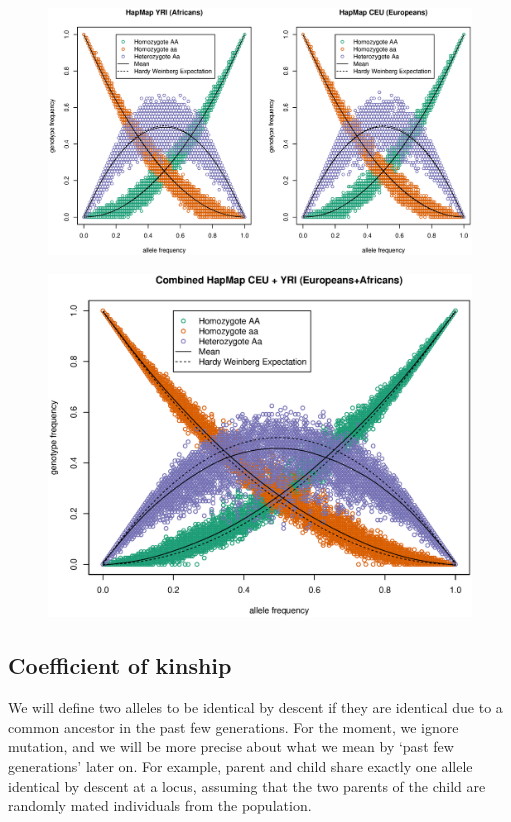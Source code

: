 
\begin{figure}
\begin{center}
\includegraphics[width=0.8 \textwidth]{figures/CEU_YRI_separately_HWE.eps}
\end{center}
\end{figure}


\begin{figure}
\begin{center}
\includegraphics[width=0.5 \textwidth]{figures/CEU_YRI_together_HWE.eps}
\end{center}
\end{figure}




\subsection{Coefficient of kinship}
We will define two alleles to be identical by descent if they are
identical due to a common ancestor in the past few generations. For the moment, we ignore mutation, and we will be more precise about what we mean by `past few generations' later on. For example, parent and child share exactly
one allele identical by descent at a locus, assuming that the two
parents of the child are randomly mated individuals from the population.\\

